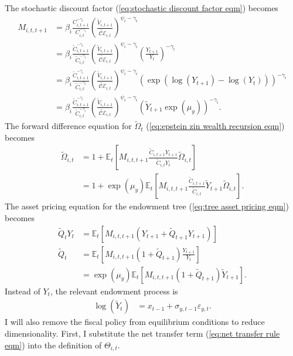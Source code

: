 \documentclass[12 pt, oneside]{article}
\theoremstyle{definition}
\theoremstyle{definition}
\theoremstyle{definition}
\newcommand{\E}{\mathbb{E}}
\newcommand{\calC}{\mathcal{C}}
\newcommand{\calE}{\mathcal{E}}
\begin{document}
The stochastic discount factor (\ref{eq:stochastic discount factor eqm}) becomes
\begin{align*}
  M_{i, t, t + 1} & = \beta_i \frac{C_{i, t + 1}^{- \gamma_i } }{C_{i, t}^{-\gamma_i} }\left(\frac{\tilde{V}_{i, t + 1}}{\tilde{\calC\calE}_{i, t}}\right)^{ \psi_i - \gamma_i}\\
               & = \beta_i\frac{\tilde{C}_{i, t + 1}^{- \gamma_i } }{\tilde{C}_{i, t}^{-\gamma_i} }\left(\frac{\tilde{V}_{i, t + 1}}{\tilde{\calC\calE}_{i, t}}\right)^{ \psi_i - \gamma_i}\left(\frac{Y_{t + 1}}{Y_t}\right)^{-\gamma_i}\\
               & = \beta_i\frac{\tilde{C}_{i, t + 1}^{- \gamma_i } }{\tilde{C}_{i, t}^{-\gamma_i} }\left(\frac{\tilde{V}_{i, t + 1}}{\tilde{\calC\calE}_{i, t}}\right)^{ \psi_i - \gamma_i}\left(\exp(\log(Y_{t + 1}) - \log(Y_t))\right)^{-\gamma_i}\\
               & = \beta_i \frac{\tilde{C}_{i, t + 1}^{- \gamma_i } }{\tilde{C}_{i, t}^{-\gamma_i} }\left(\frac{\tilde{V}_{i, t + 1}}{\tilde{\calC\calE}_{i, t}}\right)^{ \psi_i - \gamma_i}\left(\tilde{Y}_{t + 1}\exp(\mu_y)\right)^{-\gamma_i}.
\end{align*}
The forward difference equation for $\tilde{\Omega}_t$ (\ref{eq:epstein zin wealth recursion eqm}) becomes
\begin{align*}
  \tilde{\Omega}_{i, t} & = 1 + \E_t \left[M_{i, t, t + 1}\frac{\tilde{C}_{i, t + 1}Y_{t + 1}}{\tilde{C}_{i, t}Y_t}\tilde{\Omega}_{i, t}\right]\\
                  & = 1 + \exp(\mu_y)\E_t \left[M_{i, t, t + 1}\frac{\tilde{C}_{i, t + 1}}{\tilde{C}_{i, t}}\tilde{Y}_{t + 1}\tilde{\Omega}_{i, t}\right].
\end{align*}
The asset pricing equation for the endowment tree (\ref{eq:tree asset pricing eqm}) becomes
\begin{align*}
  \tilde{Q}_t Y_t & = \E_t[M_{i, t, t + 1}(Y_{t + 1} + \tilde{Q}_{t + 1} Y_{t + 1})]\\
  \tilde{Q}_t & = \E_t\left[M_{i, t, t + 1}(1 + \tilde{Q}_{t + 1})\frac{Y_{t + 1}}{Y_t}\right]\\
                  & = \exp(\mu_y)\E_t[M_{i, t, t + 1}(1 + \tilde{Q}_{t + 1})\tilde{Y}_{t + 1}].
\end{align*}
Instead of $Y_t$, the relevant endowment process is
\begin{align*}
  \log(\tilde{Y}_t) & = x_{t - 1} + \sigma_{y, t - 1} \varepsilon_{y, t}.
\end{align*}
I will also remove the fiscal policy from equilibrium conditions to reduce dimensionality. First, I substitute the net transfer term (\ref{eq:net transfer rule eqm}) into the definition of $\Theta_{i, t}$.
\end{document}
